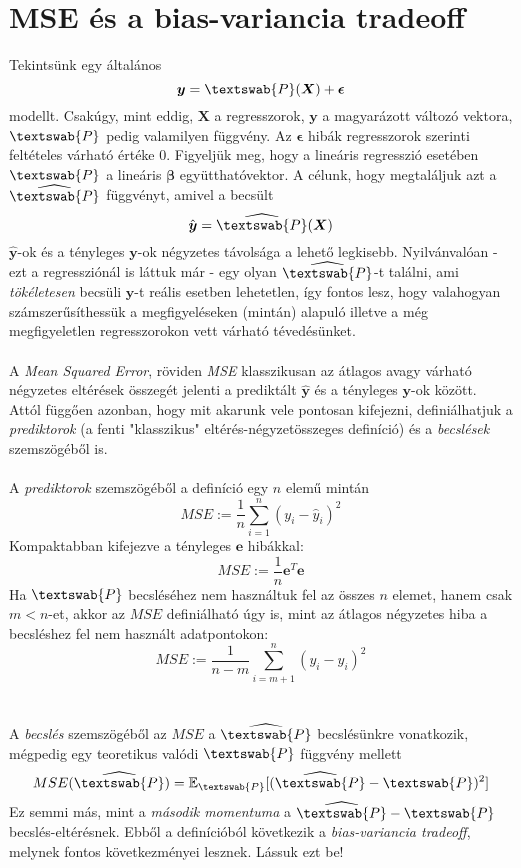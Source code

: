\documentclass[14p]{report}
\def\pmb{\boldsymbol}
\def\e{\epsilon}
\begin{document}
	\section{MSE és a bias-variancia tradeoff}
	Tekintsünk egy általános
	\[
		\pmb{y} = \textswab{P}(\pmb{X}) + \pmb{\e}
	\]
	modellt. Csakúgy, mint eddig, $\pmb{X}$ a regresszorok, $\pmb{y}$ a magyarázott változó vektora, $\textswab{P}$ pedig valamilyen függvény. Az $\pmb{\e}$ hibák regresszorok szerinti feltételes várható értéke $0$. Figyeljük meg, hogy a lineáris regresszió esetében $\textswab{P}$ a lineáris $\pmb{\beta}$ együtthatóvektor. A célunk, hogy megtaláljuk azt a $\widehat{\textswab{P}}$ függvényt, amivel a becsült
	\[
		\hat{\pmb{y}} = \widehat{\textswab{P}}(\pmb{X})
	\]
	$\hat{\pmb{y}}$-ok és a tényleges $\pmb{y}$-ok négyzetes távolsága a lehető legkisebb. Nyilvánvalóan - ezt a regressziónál is láttuk már - egy olyan $\widehat{\textswab{P}}$-t találni, ami \emph{tökéletesen} becsüli $\pmb{y}$-t reális esetben lehetetlen, így fontos lesz, hogy valahogyan számszerűsíthessük a megfigyeléseken (mintán) alapuló illetve a még megfigyeletlen regresszorokon vett várható tévedésünket.
	\\
	\\
	A \emph{Mean Squared Error}, röviden \emph{MSE} klasszikusan az átlagos avagy várható négyzetes eltérések összegét jelenti a prediktált $\hat{\pmb{y}}$ és a tényleges $\pmb{y}$-ok között. Attól függően azonban, hogy mit akarunk vele pontosan kifejezni, definiálhatjuk a \emph{prediktorok} (a fenti "klasszikus" eltérés-négyzetösszeges definíció) és a \emph{becslések} szemszögéből is. 
	\\
	\\
	A \emph{prediktorok} szemszögéből a definíció egy $n$ elemű mintán
	\[
		MSE := \frac{1}{n}\sum_{i=1}^{n}{(y_i - \hat{y}_i)^2}
	\]
	Kompaktabban kifejezve a tényleges $\pmb{e}$ hibákkal:
	\[
		MSE := \frac{1}{n}\pmb{e}^T\pmb{e}
	\]
	Ha $\textswab{P}$ becsléséhez nem használtuk fel az összes $n$ elemet, hanem csak $m < n$-et, akkor az $MSE$ definiálható úgy is, mint az átlagos négyzetes hiba a becsléshez fel nem használt adatpontokon:
	\[
		MSE := \frac{1}{n-m}\sum_{i=m+1}^{n}{(y_i - \hat{y}_i)^2}
	\]
	\\
	\\
	A \emph{becslés} szemszögéből az $MSE$ a $\widehat{\textswab{P}}$ becslésünkre vonatkozik, mégpedig egy teoretikus valódi $\textswab{P}$ függvény mellett
	\[
		MSE(\widehat{\textswab{P}}) = \mathbb{E}_{\textswab{P}}[(\widehat{\textswab{P}} - \textswab{P})^2]
	\]
	Ez semmi más, mint a \emph{második momentuma} a $\widehat{\textswab{P}} - \textswab{P}$ becslés-eltérésnek. Ebből a definícióból következik a \emph{bias-variancia tradeoff}, melynek fontos következményei lesznek. Lássuk ezt be!
\end{document}
